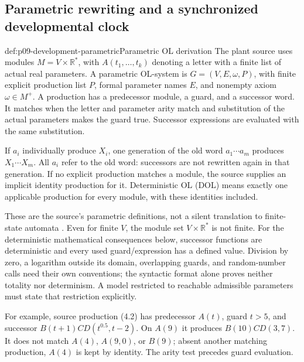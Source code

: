 \subsection{Parametric rewriting and a synchronized developmental clock}
\label{sec:p09-development-parametric}

\begin{hbdefinition}{def:p09-development-parametric}{Parametric OL derivation}
The plant source uses modules \(M=V\times\mathbb R^*\), with
\(A(t_1,\ldots,t_k)\) denoting a letter with a finite list of actual real
parameters. A parametric OL-system is \(G=(V,E,\omega,P)\), with finite
explicit production list \(P\), formal parameter names \(E\), and nonempty axiom
\(\omega\in M^+\). A production has a predecessor module, a guard, and a
successor word. It matches when the letter and parameter arity match and
substitution of the actual parameters makes the guard true. Successor
expressions are evaluated with the same substitution.

If \(a_i\) individually produce \(X_i\), one generation of the old word
\(a_1\cdots a_m\) produces \(X_1\cdots X_m\). All \(a_i\) refer to the
old word: successors are not rewritten again in that generation. If no
explicit production matches a module, the source supplies an implicit
identity production for it. Deterministic OL (DOL) means exactly one
applicable production for every module, with these identities included.
\end{hbdefinition}

These are the source's parametric definitions, not a silent translation
to finite-state automata \cite[pp.~546--548]{PrusinkiewiczEtAl1997DevelopmentIntake}.
Even for finite \(V\), the module set \(V\times\mathbb R^*\) is not finite.
For the deterministic mathematical consequences below, successor functions
are deterministic and every used guard/expression has a defined value.
Division by zero, a logarithm outside its domain, overlapping guards,
and random-number calls need their own conventions; the syntactic format
alone proves neither totality nor determinism. A model restricted to
reachable admissible parameters must state that restriction explicitly.

For example, source production (4.2) has predecessor \(A(t)\), guard
\(t>5\), and successor \(B(t+1)CD(t^{0.5},t-2)\).
On \(A(9)\) it produces \(B(10)CD(3,7)\).
It does not match \(A(4)\), \(A(9,0)\), or \(B(9)\);
absent another matching production, \(A(4)\) is kept by identity.
The arity test precedes guard evaluation.

